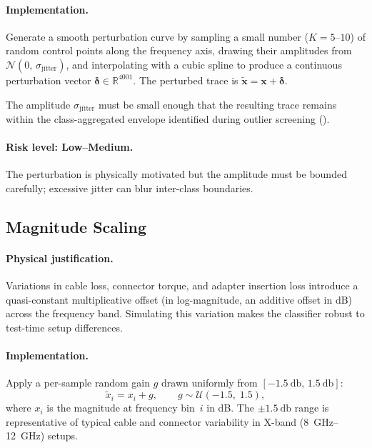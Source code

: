 \paragraph{Implementation.}
Generate a smooth perturbation curve by sampling a small number
($K = 5$--$10$) of random control points along the frequency axis,
drawing their amplitudes from $\mathcal{N}(0,\,\sigma_{\text{jitter}})$,
and interpolating with a cubic spline to produce a continuous
perturbation vector $\boldsymbol{\delta} \in \mathbb{R}^{4001}$.
The perturbed trace is $\tilde{\mathbf{x}} = \mathbf{x} +
\boldsymbol{\delta}$.

The amplitude $\sigma_{\text{jitter}}$ must be small enough that the
resulting trace remains within the class-aggregated envelope identified
during outlier screening ().

\paragraph{Risk level: \textbf{Low--Medium}.}
The perturbation is physically motivated but the amplitude must be
bounded carefully; excessive jitter can blur inter-class boundaries.

\subsection{Magnitude Scaling}
\label{sec:augment:magscale}

\paragraph{Physical justification.}
Variations in cable loss, connector torque, and adapter insertion loss
introduce a quasi-constant multiplicative offset (in log-magnitude, an
additive offset in dB) across the frequency band.  Simulating this
variation makes the classifier robust to test-time setup differences.

\paragraph{Implementation.}
Apply a per-sample random gain $g$ drawn uniformly from
$[\SI{-1.5}{\decibel},\,\SI{+1.5}{\decibel}]$:
\begin{equation}
  \tilde{x}_i = x_i + g, \qquad g \sim \mathcal{U}(-1.5,\;1.5),
  \label{eq:mag_scale}
\end{equation}
where $x_i$ is the magnitude at frequency bin~$i$ in dB.
The $\pm\SI{1.5}{\decibel}$ range is representative of typical cable
and connector variability in X-band (\SIrange{8}{12}{\giga\hertz})
setups.


